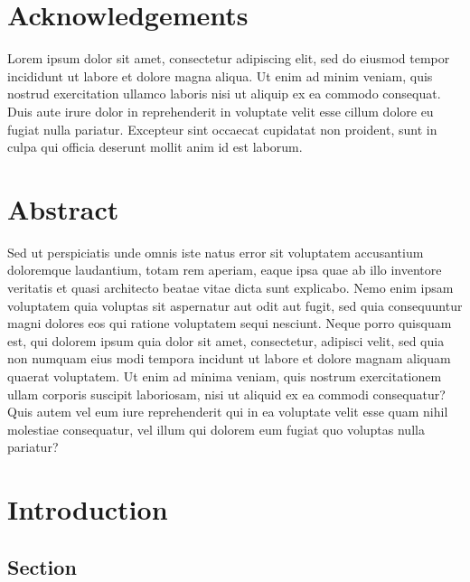 \documentclass[12pt, twoside]{report}
\begin{document}
\pagestyle{empty}



\chapter*{Acknowledgements}
\noindent Lorem ipsum dolor sit amet, consectetur adipiscing elit, sed do eiusmod tempor incididunt ut labore et dolore magna aliqua. 
Ut enim ad minim veniam, quis nostrud exercitation ullamco laboris nisi ut aliquip ex ea commodo consequat. 
Duis aute irure dolor in reprehenderit in voluptate velit esse cillum dolore eu fugiat nulla pariatur. 
Excepteur sint occaecat cupidatat non proident, sunt in culpa qui officia deserunt mollit anim id est laborum.

\chapter*{Abstract}
\noindent Sed ut perspiciatis unde omnis iste natus error sit voluptatem accusantium doloremque laudantium, totam rem aperiam, 
eaque ipsa quae ab illo inventore veritatis et quasi architecto beatae vitae dicta sunt explicabo. 
Nemo enim ipsam voluptatem quia voluptas sit aspernatur aut odit aut fugit, sed quia consequuntur magni dolores eos qui ratione voluptatem sequi nesciunt. 
Neque porro quisquam est, qui dolorem ipsum quia dolor sit amet, consectetur, adipisci velit, sed quia non numquam eius modi tempora incidunt ut labore et dolore magnam aliquam 
quaerat voluptatem. Ut enim ad minima veniam, quis nostrum exercitationem ullam corporis suscipit laboriosam, nisi ut aliquid ex ea commodi consequatur? 
Quis autem vel eum iure reprehenderit qui in ea voluptate velit esse quam nihil molestiae consequatur, vel illum qui dolorem eum fugiat quo voluptas nulla pariatur?
\tableofcontents


\pagestyle{plain}

\chapter{Introduction}\label{chp:intro}

\section{Section}
\end{document}
